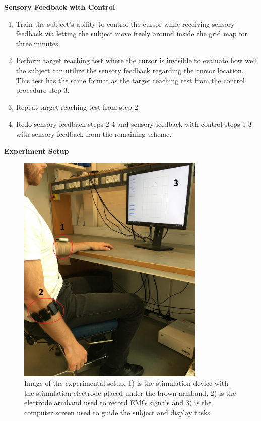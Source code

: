 \textbf{Sensory Feedback with Control} \\
\vspace{-25pt}
\begin{enumerate}
	\item Train the subject's ability to control the cursor while receiving sensory feedback via letting the subject move freely around inside the grid map for three minutes.
	\item Perform target reaching test where the cursor is invisible to evaluate how well the subject can utilize the sensory feedback regarding the cursor location. This test has the same format as the target reaching test from the control procedure step 3.
	\item Repeat target reaching test from step 2.
	\item Redo sensory feedback steps 2-4 and sensory feedback with control steps 1-3 with sensory feedback from the remaining scheme.
\end{enumerate}


\newpage
\textbf{{\Large Experiment Setup}} \\

\begin{figure}[H]                 
	\includegraphics[width=0.8\textwidth]{figures/setupimg}  
	\caption{Image of the experimental setup. 1) is the stimulation device with the stimulation electrode placed under the brown armband, 2) is the electrode armband used to record EMG signals and 3) is the computer screen used to guide the subject and display tasks.} 
	\label{fig:setup} 
\end{figure}

